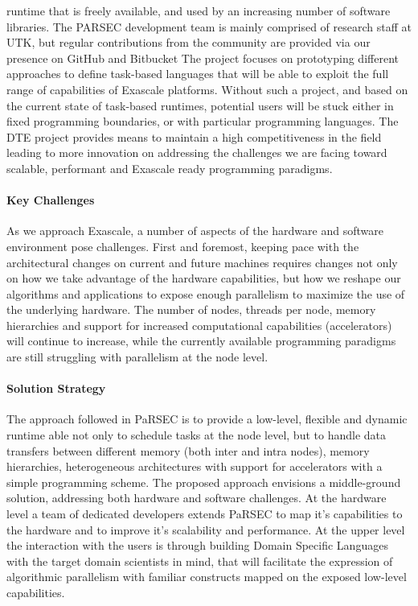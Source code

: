 runtime that is freely available, and used by an increasing number of software
libraries. The PARSEC development team is mainly comprised of research staff at
UTK, but regular contributions from the community are provided via our presence
on GitHub and Bitbucket The project focuses on prototyping different
approaches to define task-based languages that will be able to exploit the full
range of capabilities of Exascale platforms. Without such a project, and based
on the current state of task-based runtimes, potential users will be stuck
either in fixed programming boundaries, or with particular programming
languages. The DTE project provides means to maintain a high competitiveness in the
field leading to more innovation on addressing the challenges we are facing
toward scalable, performant and Exascale ready programming paradigms.

\paragraph{Key  Challenges}

As we approach Exascale, a number of aspects of the hardware and software
environment pose challenges. First and foremost, keeping pace with the
architectural changes on current and future machines requires changes not only
on how we take advantage of the hardware capabilities, but how we reshape our
algorithms and applications to expose enough parallelism to maximize the use of
the underlying hardware. The number of nodes, threads per node, memory
hierarchies and support for increased computational capabilities (accelerators)
will continue to increase, while the currently available programming paradigms
are still struggling with parallelism at the node level.

\paragraph{Solution Strategy}
The approach followed in PaRSEC is to provide a low-level, flexible and dynamic
runtime able not only to schedule tasks at the node level, but to handle data
transfers between different memory (both inter and intra nodes), memory
hierarchies, heterogeneous architectures with support for accelerators with a
simple programming scheme. The proposed approach envisions a middle-ground
solution, addressing both hardware and software challenges. At the hardware
level a team of dedicated developers extends PaRSEC to map it's capabilities to
the hardware and to improve it's scalability and performance. At the upper level
the interaction with the users is through building Domain Specific Languages
with the target domain scientists in mind, that will facilitate the expression
of algorithmic parallelism with familiar constructs mapped on the exposed low-level
capabilities.

